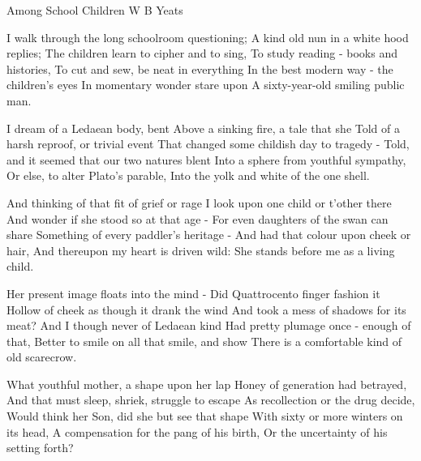 \begin{poem}{Among School Children}
{W B Yeats}
 
 I walk through the long schoolroom questioning;
 A kind old nun in a white hood replies;
 The children learn to cipher and to sing,
 To study reading - books and histories,
 To cut and sew, be neat in everything
 In the best modern way - the children's eyes
 In momentary wonder stare upon
 A sixty-year-old smiling public man.\\
 
 
 I dream of a Ledaean body, bent
 Above a sinking fire,  a tale that she
 Told of a harsh reproof, or trivial event
 That changed some childish day to tragedy - 
 Told, and it seemed that our two natures blent
 Into a sphere from youthful sympathy,
 Or else, to alter Plato's parable,
 Into the yolk and white of the one shell.\\
 
 
 And thinking of that fit of grief or rage
 I look upon one child or t'other there
 And wonder if she stood so at that age - 
 For even daughters of the swan can share
 Something of every paddler's heritage - 
 And had that colour upon cheek or hair,
 And thereupon my heart is driven wild:
 She stands before me as a living child.\\
 
 
 Her present image floats into the mind - 
 Did Quattrocento finger fashion it
 Hollow of cheek as though it drank the wind
 And took a mess of shadows for its meat?
 And I though never of Ledaean kind
 Had pretty plumage once - enough of that,
 Better to smile on all that smile, and show
 There is a comfortable kind of old scarecrow.\\
 
 
 What youthful mother, a shape upon her lap
 Honey of generation had betrayed,
 And that must sleep, shriek, struggle to escape
 As recollection or the drug decide,
 Would think her Son, did she but see that shape
 With sixty or more winters on its head,
 A compensation for the pang of his birth,
 Or the uncertainty of his setting forth?\\
 
 

\end{poem}
